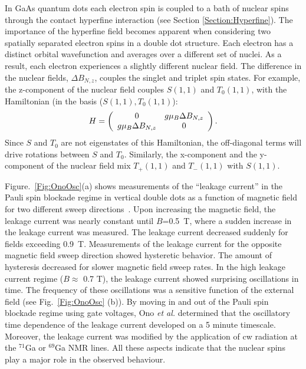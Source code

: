 \documentclass[rmp,twocolumn,aps]{revtex4}
\begin{document}
In GaAs quantum dots each electron spin is coupled to a bath of
nuclear spins through the contact hyperfine interaction (see
Section \ref{Section:Hyperfine}). The importance of the hyperfine
field becomes apparent when considering two spatially separated
electron spins in a double dot structure. Each electron has a
distinct orbital wavefunction and averages over a different set of
nuclei. As a result, each electron experiences a slightly
different nuclear field. The difference in the nuclear fields,
$\Delta$$B_{N,z}$, couples the singlet and triplet spin states. For
example, the z-component of the nuclear field couples $S(1,1)$ and
$T_0(1,1)$, with the Hamiltonian (in the basis ($S(1,1), T_0(1,1)$):
\begin{equation}
H= \left(\begin{array}{c c}
0 & g \mu_B \Delta B_{N,z}\\
g \mu_B \Delta B_{N,z} & 0 \end{array}\right).
\end{equation}
Since $S$ and $T_0$ are not eigenstates of this Hamiltonian, the off-diagonal terms will drive rotations between $S$ and $T_0$.
Similarly, the x-component and the y-component of the nuclear
field mix $T_+(1,1)$ and $T_-(1,1)$ with $S(1,1)$.

Figure.~\ref{Fig:OnoOsc}(a) shows measurements of the ``leakage
current'' in the Pauli spin blockade regime in vertical double dots
as a function of magnetic field for two different sweep
directions~\cite{OnoPRL2004}. Upon increasing the magnetic field,
the leakage current was nearly constant until $B$=0.5~T, where a
sudden increase in the leakage current was measured. The leakage
current decreased suddenly for fields exceeding 0.9~T.
Measurements of the leakage current for the opposite magnetic
field sweep direction showed hysteretic behavior. The amount of
hysteresis decreased for slower magnetic field sweep rates. In the
high leakage current regime ($B\approx$ 0.7 T), the leakage
current showed surprising oscillations in time. The frequency of
these oscillations was a sensitive function of the external field
(see Fig.\ \ref{Fig:OnoOsc} (b)). By moving in and out of the
Pauli spin blockade regime using gate voltages, Ono \textit{et
al.} determined that the oscillatory time dependence of the
leakage current developed on a 5 minute timescale. Moreover, the
leakage current was modified by the application of cw radiation at
the $^{71}$Ga or $^{69}$Ga NMR lines. All these aspects indicate
that the nuclear spins play a major role in the observed
behaviour.
\end{document}
